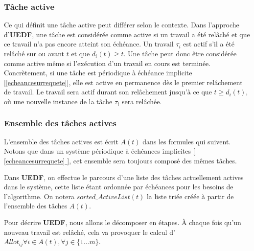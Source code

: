 	\subsubsection{Tâche active}\label{tacheactive}
	Ce qui définit une tâche \og{}active\fg{} peut différer selon le contexte. Dans l'approche d'\textbf{UEDF}, une tâche est 
	considérée comme active si un travail a été relâché et que ce travail n'a pas encore atteint son échéance. 
	Un travail $\tau_i$ est actif s'il a été relâché sur ou avant $t$ et que $d_i(t) \geq t$.
	Une tâche peut donc 
	être considérée comme active même si l'exécution d'un travail en cours est terminée. 
	Concrètement, si une tâche est périodique à échéance implicite [\hyperref[echeancesurrequete]{\ref*{echeancesurrequete}}], elle est active en permanence dès le 
	premier relâchement de travail. Le travail sera actif durant son relâchement jusqu'à ce que $t \geq d_i(t)$, où 
	une nouvelle instance de la tâche $\tau_i$ sera relâchée.
	
	
	\subsubsection{Ensemble des tâches actives}\label{ensembledestachesactives}
	L'ensemble des tâches actives est écrit $A(t)$ dans les formules qui suivent. Notons que dans un système 
	périodique à échéances implicites \hyperref[echeancesurrequete]{[ \ref*{echeancesurrequete} ]}, cet ensemble 
	sera toujours composé des mêmes tâches.\newline
		
	Dans \textbf{UEDF}, on effectue le parcours d'une liste des tâches actuellement actives dans le système, 
	cette liste étant ordonnée par échéances pour les besoins de l'algorithme. 
	On notera $sorted\_ActiveList(t)$ la liste triée créée à partir de l'ensemble des tâches $A(t)$.\newline
	
	Pour décrire \textbf{UEDF}, nous allons le décomposer en étapes.
	À chaque fois qu'un nouveau travail est relâché, cela va provoquer le calcul d'$Allot_{ij} \forall i \in A(t), \forall j \in \{1 ... m\}$.

